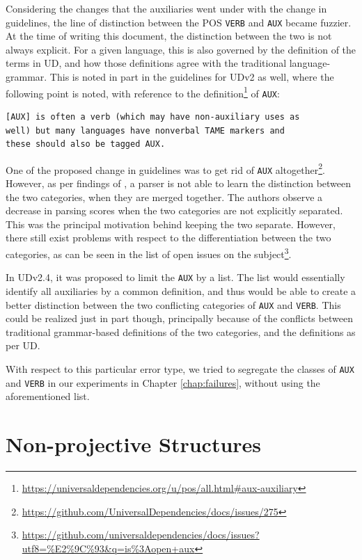 Considering the changes that the auxiliaries went under with the change in guidelines, the line of distinction between the POS \verb|VERB| and \verb|AUX| became fuzzier. At the time of writing this document, the distinction between the two is not always explicit. For a given language, this is also governed by the definition of the terms in UD, and how those definitions agree with the traditional language-grammar. This is noted in part in the guidelines for UDv2 as well, where the following point is noted, with reference to the definition\footnote{\url{https://universaldependencies.org/u/pos/all.html\#aux-auxiliary}} of \verb|AUX|:

\begin{verbatim}
[AUX] is often a verb (which may have non-auxiliary uses as 
well) but many languages have nonverbal TAME markers and
these should also be tagged AUX.
\end{verbatim}

One of the proposed change in guidelines was to get rid of \verb|AUX| altogether\footnote{\url{https://github.com/UniversalDependencies/docs/issues/275}}. However, as per findings of \cite{de2016should}, a parser is not able to learn the distinction between the two categories, when they are merged together. The authors observe a decrease in parsing scores when the two categories are not explicitly separated. This was the principal motivation behind keeping the two separate. However, there still exist problems with respect to the differentiation between the two categories, as can be seen in the list of open issues on the subject\footnote{\url{https://github.com/universaldependencies/docs/issues?utf8=\%E2\%9C\%93&q=is\%3Aopen+aux}}.

In UDv2.4, it was proposed to limit the \verb|AUX| by a list. The list would essentially identify all auxiliaries by a common definition, and thus would be able to create a better distinction between the two conflicting categories of \verb|AUX| and \verb|VERB|. This could be realized just in part though, principally because of the conflicts between traditional grammar-based definitions of the two categories, and the definitions as per UD.

With respect to this particular error type, we tried to segregate the classes of \verb|AUX| and \verb|VERB| in our experiments in Chapter \ref{chap:failures}, without using the aforementioned list. 

\section{Non-projective Structures}
\label{ssec:nonproj}

